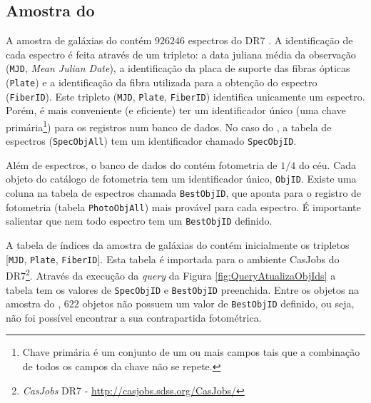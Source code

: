 \subsection{Amostra do \STARLIGHT}
\label{sec:Crossmatch:AmostraStarlight}

A amostra de galáxias do \starlight contém $926246$ espectros do \SDSS DR7
\citep{Abazajian2009}. A identificação de cada espectro é feita através de um
tripleto: a data juliana média da observação (\texttt{MJD}, {\em Mean Julian
Date}), a identificação da placa de suporte das fibras ópticas (\texttt{Plate})
e a identificação da fibra utilizada para a obtenção do espectro
(\texttt{FiberID}). Este tripleto (\texttt{MJD}, \texttt{Plate},
\texttt{FiberID}) identifica unicamente um espectro. Porém, é mais conveniente
(e eficiente) ter um identificador único (uma chave primária\footnote{Chave
primária é um conjunto de um ou mais campos tais que a combinação de todos os
campos da chave não se repete.}) para os registros num banco de dados. No caso
do \SDSS, a tabela de espectros (\texttt{SpecObjAll}) tem um identificador
chamado \texttt{SpecObjID}.

Além de espectros, o banco de dados do \SDSS contém fotometria de $1/4$ do céu.
Cada objeto do catálogo de fotometria tem um identificador único,
\texttt{ObjID}. Existe uma coluna na tabela de espectros chamada
\texttt{BestObjID}, que aponta para o registro de fotometria (tabela
\texttt{PhotoObjAll}) mais provável para cada espectro. É importante salientar
que nem todo espectro tem um \texttt{BestObjID} definido.

A tabela de índices da amostra de galáxias do \starlight contém inicialmente os
tripletos [\texttt{MJD}, \texttt{Plate}, \texttt{FiberID}]. Esta tabela é
importada para o ambiente {CasJobs} do \SDSS DR7\footnote{{\em CasJobs} \SDSS
DR7 - \url{http://casjobs.sdss.org/CasJobs/}}. Através da execução da {\em
query} da Figura \ref{fig:QueryAtualizaObjIds} a tabela tem os valores de
\texttt{SpecObjID} e \texttt{BestObjID} preenchida. Entre os objetos na amostra
do \starlight, $622$ objetos não possuem um valor de \texttt{BestObjID}
definido, ou seja, não foi possível encontrar a sua contrapartida fotométrica.




